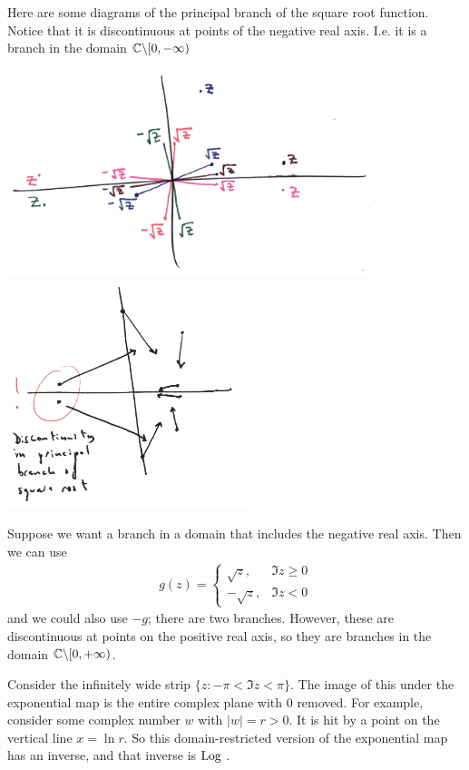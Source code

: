 \documentclass[12pt]{article}
\begin{document}
Here are some diagrams of the principal branch of the square root
function. Notice that it is discontinuous at points of the negative real
axis. I.e. it is a branch in the domain $\mathbb{C} \backslash [0, -\infty)$

\includegraphics[width=300pt]{img/principal-sqrt-2.png}
\includegraphics[width=200pt]{img/principal-sqrt.png}

Suppose we want a branch in a domain that includes the negative real axis. Then we can use
\begin{align*}
  g(z) =
  \begin{cases}
    \sqrt z,  &\Im z \geq 0\\
    -\sqrt z, &\Im z < 0
  \end{cases}
\end{align*}
and we could also use $-g$; there are two branches. However, these are
discontinuous at points on the positive real axis, so they are branches in the
domain $\mathbb{C} \backslash [0, +\infty)$.

Consider the infinitely wide strip $\{z: -\pi < \Im z < \pi\}$. The image of
this under the exponential map is the entire complex plane with 0 removed. For
example, consider some complex number $w$ with $|w| = r > 0$. It is hit by a
point on the vertical line $x = \ln r$. So this domain-restricted version of
the exponential map has an inverse, and that inverse is $\text{Log}~$.
\end{document}
